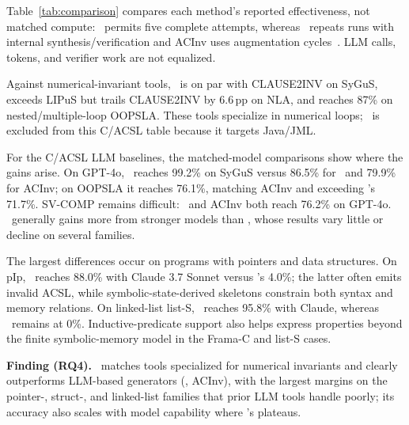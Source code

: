{Table~\ref{tab:comparison} compares each method's reported effectiveness, not matched compute: \toolname\ permits five complete attempts, whereas \autospec\ repeats runs with internal synthesis/verification and ACInv uses augmentation cycles~\cite{autospec,Enhancing_Automated_Loop_Invariant_Generation_for_Complex_Programs_with_Large_Language_Models}. LLM calls, tokens, and verifier work are not equalized.}

Against numerical-invariant tools, \toolname\ is on par with CLAUSE2INV on
SyGuS, exceeds LIPuS but trails CLAUSE2INV by 6.6\,pp on NLA, and reaches
87\% on nested/multiple-loop OOPSLA. These tools specialize in numerical
loops; \specgen\ is excluded from this C/ACSL table because it targets
Java/JML.

For the C/ACSL LLM baselines, the matched-model comparisons show where the
gains arise. On GPT-4o, \toolname\ reaches 99.2\% on SyGuS versus 86.5\% for
\autospec\ and 79.9\% for ACInv; on OOPSLA it reaches 76.1\%, matching ACInv
and exceeding \autospec's 71.7\%. SV-COMP remains difficult: \toolname\ and
ACInv both reach 76.2\% on GPT-4o. \toolname\ generally gains more from
stronger models than \autospec, whose results vary little or decline on
several families.

The largest differences occur on programs with pointers and data structures.
On pIp, \toolname\ reaches 88.0\% with Claude 3.7 Sonnet versus \autospec's
4.0\%; the latter often emits invalid ACSL, while symbolic-state-derived
skeletons constrain both syntax and memory relations. On linked-list list-S,
\toolname\ reaches 95.8\% with Claude, whereas \autospec\ remains at 0\%.
Inductive-predicate support also helps express properties beyond the finite
symbolic-memory model in the Frama-C and list-S cases.

\begin{finding}
\textbf{Finding (RQ4).} \toolname\ matches tools specialized for numerical invariants and clearly outperforms LLM-based generators (\autospec, ACInv), with the largest margins on the pointer-, struct-, and linked-list families that prior LLM tools handle poorly; its accuracy also scales with model capability where \autospec's plateaus.
\end{finding}






